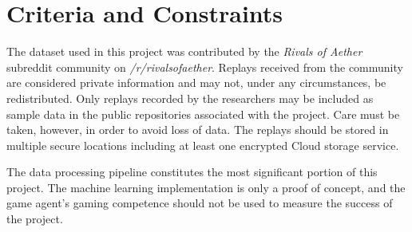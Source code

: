 


\section{Criteria and Constraints}

The dataset used in this project was contributed by the \textit{Rivals of Aether} subreddit community on \textit{/r/rivalsofaether}. Replays received from the community are considered private information and may not, under any circumstances, be redistributed. Only replays recorded by the researchers may be included as sample data in the public repositories associated with the project. Care must be taken, however, in order to avoid loss of data. The replays should be stored in multiple secure locations including at least one encrypted Cloud storage service.

The data processing pipeline constitutes the most significant portion of this project. The machine learning implementation is only a proof of concept, and the game agent's gaming competence should not be used to measure the success of the project.


